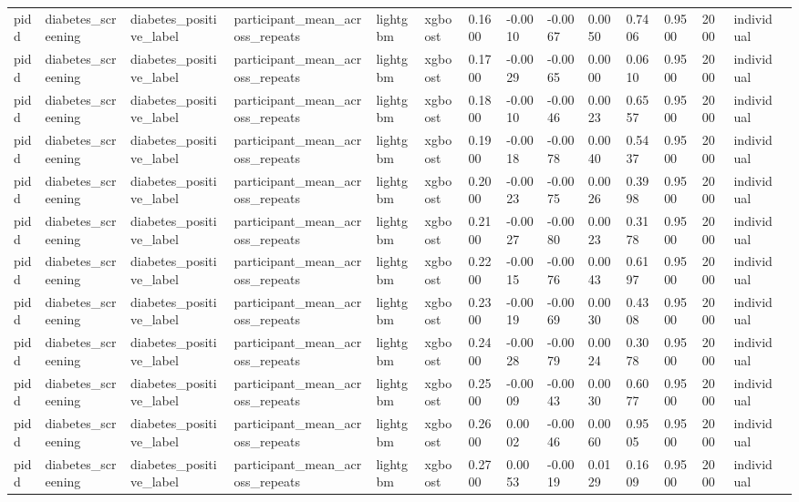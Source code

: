 \begin{tabular}{lllllllllllllll}
pidd & diabetes\_screening & diabetes\_positive\_label & participant\_mean\_across\_repeats & lightgbm & xgboost & 0.1600 & -0.0010 & -0.0067 & 0.0050 & 0.7406 & 0.9500 & 2000 & individual &  \\
pidd & diabetes\_screening & diabetes\_positive\_label & participant\_mean\_across\_repeats & lightgbm & xgboost & 0.1700 & -0.0029 & -0.0065 & 0.0000 & 0.0610 & 0.9500 & 2000 & individual &  \\
pidd & diabetes\_screening & diabetes\_positive\_label & participant\_mean\_across\_repeats & lightgbm & xgboost & 0.1800 & -0.0010 & -0.0046 & 0.0023 & 0.6557 & 0.9500 & 2000 & individual &  \\
pidd & diabetes\_screening & diabetes\_positive\_label & participant\_mean\_across\_repeats & lightgbm & xgboost & 0.1900 & -0.0018 & -0.0078 & 0.0040 & 0.5437 & 0.9500 & 2000 & individual &  \\
pidd & diabetes\_screening & diabetes\_positive\_label & participant\_mean\_across\_repeats & lightgbm & xgboost & 0.2000 & -0.0023 & -0.0075 & 0.0026 & 0.3998 & 0.9500 & 2000 & individual &  \\
pidd & diabetes\_screening & diabetes\_positive\_label & participant\_mean\_across\_repeats & lightgbm & xgboost & 0.2100 & -0.0027 & -0.0080 & 0.0023 & 0.3178 & 0.9500 & 2000 & individual &  \\
pidd & diabetes\_screening & diabetes\_positive\_label & participant\_mean\_across\_repeats & lightgbm & xgboost & 0.2200 & -0.0015 & -0.0076 & 0.0043 & 0.6197 & 0.9500 & 2000 & individual &  \\
pidd & diabetes\_screening & diabetes\_positive\_label & participant\_mean\_across\_repeats & lightgbm & xgboost & 0.2300 & -0.0019 & -0.0069 & 0.0030 & 0.4308 & 0.9500 & 2000 & individual &  \\
pidd & diabetes\_screening & diabetes\_positive\_label & participant\_mean\_across\_repeats & lightgbm & xgboost & 0.2400 & -0.0028 & -0.0079 & 0.0024 & 0.3078 & 0.9500 & 2000 & individual &  \\
pidd & diabetes\_screening & diabetes\_positive\_label & participant\_mean\_across\_repeats & lightgbm & xgboost & 0.2500 & -0.0009 & -0.0043 & 0.0030 & 0.6077 & 0.9500 & 2000 & individual &  \\
pidd & diabetes\_screening & diabetes\_positive\_label & participant\_mean\_across\_repeats & lightgbm & xgboost & 0.2600 & 0.0002 & -0.0046 & 0.0060 & 0.9505 & 0.9500 & 2000 & individual &  \\
pidd & diabetes\_screening & diabetes\_positive\_label & participant\_mean\_across\_repeats & lightgbm & xgboost & 0.2700 & 0.0053 & -0.0019 & 0.0129 & 0.1609 & 0.9500 & 2000 & individual &  \\

\end{tabular}
